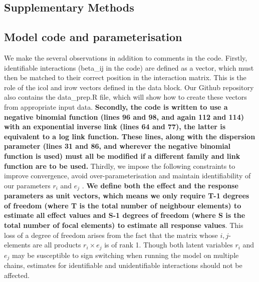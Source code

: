 
\setcounter{figure}{0}
\setcounter{section}{0}
\setcounter{table}{0}
\setcounter{equation}{0}
\renewcommand{\thefigure}{S\arabic{figure}}
\renewcommand{\thetable}{S\arabic{table}}
\renewcommand{\thesection}{S\arabic{section}}
\renewcommand{\theequation}{S\arabic{equation}}

\begin{refsection}

\section{Supplementary Methods}

\label{SI:Methods}

    \subsection{Model code and parameterisation}
    \label{SI:modelcode}
    

    We make the several observations in addition to comments in the code. Firstly, identifiable interactions (beta\_ij in the code) are defined as a vector, which must then be matched to their correct position in the interaction matrix. This is the role of the icol and irow vectors defined in the data block. Our Github repository also contains the data\_prep.R file, which will show how to create these vectors from appropriate input data. 
    \textbf{Secondly, the code is written to use a negative binomial function (lines 96 and 98, and again 112 and 114) with an exponential inverse link (lines 64 and 77), the latter is equivalent to a log link function. These lines, along with the dispersion parameter (lines 31 and 86, and wherever the negative binomial function is used) must all be modified if a different family and link function are to be used.}
    Thirdly, we impose the following constraints to improve convergence, avoid over-parameterisation and maintain identifiability of our parameters $r_i$ and $e_j$ \parencite{Huber2004, Kidzinski2020, Niku2021}. \textbf{We define both the effect and the response parameters as unit vectors, which means we only require T-1 degrees of freedom (where T is the total number of neighbour elements) to estimate all effect values and S-1 degrees of freedom (where S is the total number of focal elements) to estimate all response values}. This loss of a degree of freedom arises from the fact that the matrix whose $i,j$-elements are all products $r_i \times e_j$ is of rank 1. Though both latent variables $r_i$ and $e_j$ may be susceptible to sign switching when running the model on multiple chains, estimates for identifiable and unidentifiable interactions should not be affected.


\end{refsection}
